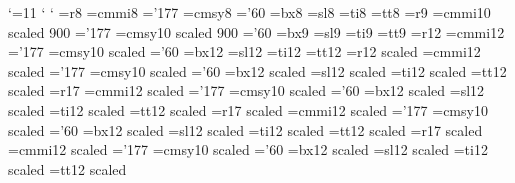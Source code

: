 %
%
%
\edef\catcodeat{\the\catcode`\@}\catcode`\@=11
\edef\catcode@gt{\the\catcode`\>}\catcode`
\edef\catcode@lt{\the\catcode`\<}\catcode`
\def\makeatletter{\catcode`\@=11}
\def\makeatother{\catcode`\@=12}
%
%
\def\fontid{\fonthdg\fonthdge}
%
%
\font\eightrm=\fontid r8
\font\eighti=cmmi8 \skewchar\eighti='177
\font\eightsy=cmsy8 \skewchar\eightsy='60
\font\eightbf=\fontid bx8
\font\eightsl=\fontid sl8
\font\eightit=\fontid ti8
\font\eighttt=\fontid tt8
%
%
\font\ninerm=\fontid r9
\font\ninei=cmmi10 scaled 900 \skewchar\ninei='177
\font\ninesy=cmsy10 scaled 900 \skewchar\ninesy='60
\font\ninebf=\fontid bx9
\font\ninesl=\fontid sl9
\font\nineit=\fontid ti9
\font\ninett=\fontid tt9
%
%
\font\twlrm=\fontid r12
\font\twli=cmmi12 \skewchar\twli='177
\font\twlsy=cmsy10 scaled  \skewchar\twlsy='60
\font\twlbf=\fontid bx12
\font\twlsl=\fontid sl12
\font\twlit=\fontid ti12
\font\twltt=\fontid tt12
%
%
\font\frtrm=\fontid r12 scaled 
\font\frti=cmmi12 scaled  \skewchar\frti='177
\font\frtsy=cmsy10 scaled  \skewchar\frtsy='60
\font\frtbf=\fontid bx12 scaled 
\font\frtsl=\fontid sl12 scaled 
\font\frtit=\fontid ti12 scaled 
\font\frttt=\fontid tt12 scaled 
%
%
\font\svtrm=\fontid r17 
\font\svti=cmmi12 scaled  \skewchar\svti='177
\font\svtsy=cmsy10 scaled  \skewchar\svtsy='60
\font\svtbf=\fontid bx12 scaled 
\font\svtsl=\fontid sl12 scaled 
\font\svtit=\fontid ti12 scaled 
\font\svttt=\fontid tt12 scaled 
%
%
\font\twtyrm=\fontid r17 scaled 
\font\twtyi=cmmi12 scaled  \skewchar\twtyi='177
\font\twtysy=cmsy10 scaled \skewchar\twtysy='60
\font\twtybf=\fontid bx12 scaled 
\font\twtysl=\fontid sl12 scaled 
\font\twtyit=\fontid ti12 scaled 
\font\twtytt=\fontid tt12 scaled 
%
%
\font\twfvrm=\fontid r17 scaled 
\font\twfvi=cmmi12 scaled  \skewchar\twfvi='177
\font\twfvsy=cmsy10 scaled  \skewchar\twfvsy='60
\font\twfvbf=\fontid bx12 scaled 
\font\twfvsl=\fontid sl12 scaled 
\font\twfvit=\fontid ti12 scaled 
\font\twfvtt=\fontid tt12 scaled 
%
% 
\def\twfvpoint{\Twfvpoint}
